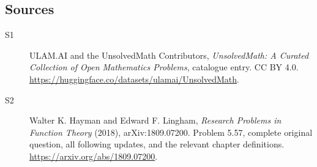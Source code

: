 \documentclass[11pt]{book}
\begin{document}
\subsection{Sources}
\begin{description}
\item[\hypertarget{source:statement:1}{S1}] ULAM.AI and the UnsolvedMath Contributors, \emph{UnsolvedMath: A Curated Collection of Open Mathematics Problems}, catalogue entry. CC BY 4.0. \url{https://huggingface.co/datasets/ulamai/UnsolvedMath}.
\item[\hypertarget{source:statement:2}{S2}] Walter K. Hayman and Edward F. Lingham, \emph{Research Problems in Function Theory} (2018), arXiv:1809.07200. Problem 5.57, complete original question, all following updates, and the relevant chapter definitions. \url{https://arxiv.org/abs/1809.07200}.
\end{description}
\label{end:statement}
\end{document}
